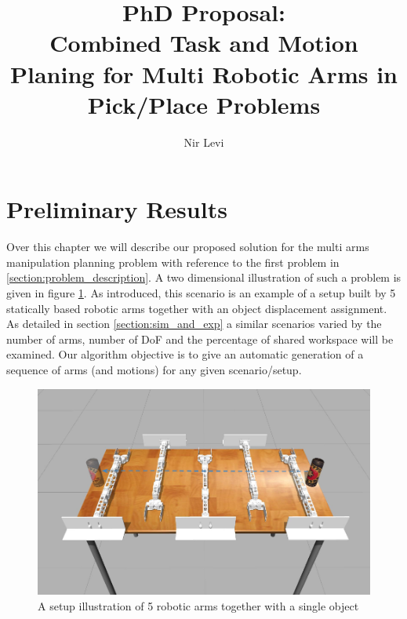 \documentclass[english]{article}
\theoremstyle{definition}
\begin{document}
\title{PhD Proposal: \\ Combined Task and Motion Planing for Multi Robotic Arms in Pick/Place Problems}

\author{Nir Levi}

\maketitle

\newpage
\tableofcontents
\listoffigures


\newpage


\newpage


\newpage


\newpage
%

\section{Preliminary Results}

Over this chapter we will describe our proposed solution for the multi arms manipulation planning problem with reference to the first problem in \ref{section:problem_description}. A two dimensional illustration of such a problem is given in figure \ref{fig:case_study}. As introduced, this scenario is an example of a setup built by 5 statically based robotic arms together with an object displacement assignment. As detailed in section \ref{section:sim_and_exp} a similar scenarios varied by the number of arms, number of DoF and the percentage of shared workspace will be examined. Our algorithm objective is to give an automatic generation of a sequence of arms (and motions) for any given scenario/setup.
 
\begin{figure}[htb]
\includegraphics[scale=0.3,width=\textwidth]{5arms}
\centering
\caption{A setup illustration of 5 robotic arms together with a single object} 
\label{fig:case_study}
\centering
\end{figure}
\end{document}
